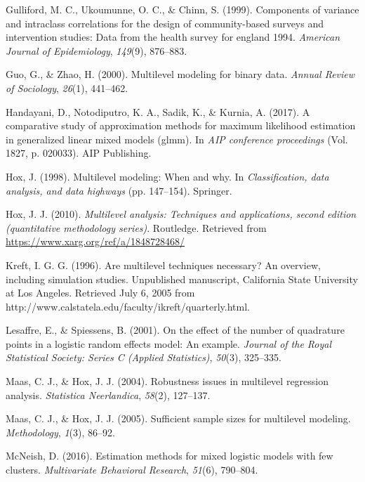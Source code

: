 \documentclass[12pt,oneside,a4paper]{reedthesis}
\begin{document}
\leavevmode\hypertarget{ref-gulliford1999components}{}%
Gulliford, M. C., Ukoumunne, O. C., \& Chinn, S. (1999). Components of variance and intraclass correlations for the design of community-based surveys and intervention studies: Data from the health survey for england 1994. \emph{American Journal of Epidemiology}, \emph{149}(9), 876--883.

\leavevmode\hypertarget{ref-guo2000multilevel}{}%
Guo, G., \& Zhao, H. (2000). Multilevel modeling for binary data. \emph{Annual Review of Sociology}, \emph{26}(1), 441--462.

\leavevmode\hypertarget{ref-handayani2017comparative}{}%
Handayani, D., Notodiputro, K. A., Sadik, K., \& Kurnia, A. (2017). A comparative study of approximation methods for maximum likelihood estimation in generalized linear mixed models (glmm). In \emph{AIP conference proceedings} (Vol. 1827, p. 020033). AIP Publishing.

\leavevmode\hypertarget{ref-hox1998multilevel}{}%
Hox, J. (1998). Multilevel modeling: When and why. In \emph{Classification, data analysis, and data highways} (pp. 147--154). Springer.

\leavevmode\hypertarget{ref-joophox2010}{}%
Hox, J. J. (2010). \emph{Multilevel analysis: Techniques and applications, second edition (quantitative methodology series)}. Routledge. Retrieved from \url{https://www.xarg.org/ref/a/1848728468/}

\leavevmode\hypertarget{ref-kreft1996}{}%
Kreft, I. G. G. (1996). Are multilevel techniques necessary? An overview, including simulation studies. Unpublished manuscript, California State University at Los Angeles. Retrieved July 6, 2005 from http://www.calstatela.edu/faculty/ikreft/quarterly.html.

\leavevmode\hypertarget{ref-lesaffre2001effect}{}%
Lesaffre, E., \& Spiessens, B. (2001). On the effect of the number of quadrature points in a logistic random effects model: An example. \emph{Journal of the Royal Statistical Society: Series C (Applied Statistics)}, \emph{50}(3), 325--335.

\leavevmode\hypertarget{ref-maas2004robustness}{}%
Maas, C. J., \& Hox, J. J. (2004). Robustness issues in multilevel regression analysis. \emph{Statistica Neerlandica}, \emph{58}(2), 127--137.

\leavevmode\hypertarget{ref-maas2005sufficient}{}%
Maas, C. J., \& Hox, J. J. (2005). Sufficient sample sizes for multilevel modeling. \emph{Methodology}, \emph{1}(3), 86--92.

\leavevmode\hypertarget{ref-mcneish2016estimation}{}%
McNeish, D. (2016). Estimation methods for mixed logistic models with few clusters. \emph{Multivariate Behavioral Research}, \emph{51}(6), 790--804.
\end{document}
